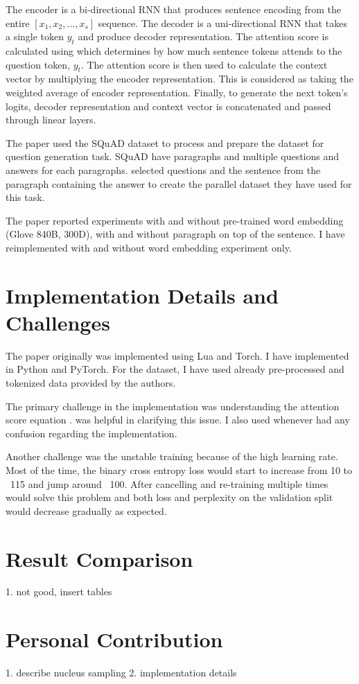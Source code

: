 \documentclass{article}
\begin{document}
	The encoder is a bi-directional RNN that produces sentence encoding from the entire $[x_1, x_2,..., x_s]$ sequence. The decoder is a uni-directional RNN that takes a single token $y_t$ and produce decoder representation. The attention score is calculated using \citet{luong2015effective} which determines by how much sentence tokens attends to the question token, $y_t$. The attention score is then used to calculate the context vector by multiplying the encoder representation. This is considered as taking the weighted average of encoder representation. Finally, to generate the next token's logits, decoder representation and context vector is concatenated and passed through linear layers. 
	
	The paper used the SQuAD dataset to process and prepare the dataset for question generation task. SQuAD have paragraphs and multiple questions and answers for each paragraphs. \cite{du2017learning} selected questions and the sentence from the paragraph containing the answer to create the parallel dataset they have used for this task.
	
	The paper reported experiments with and without pre-trained word embedding (Glove 840B, 300D), with and without paragraph on top of the sentence. I have reimplemented with and without word embedding experiment only.
	
	\section{Implementation Details and Challenges}
	
	The paper originally was implemented using Lua and Torch. I have implemented in Python and PyTorch. For the dataset, I have used already pre-processed and tokenized data provided by the authors. 
	
	The primary challenge in the implementation was understanding the attention score equation \cite[see][eq 5]{du2017learning}. \citet{luong2015effective} was helpful in clarifying this issue. I also used \citet{pytorchFromScratch} whenever had any confusion regarding the implementation. 
	
	Another challenge was the unstable training because of the high learning rate. Most of the time, the binary cross entropy loss would start to increase from 10 to ~115 and jump around ~100. After cancelling and re-training multiple times would solve this problem and both loss and perplexity on the validation split would decrease gradually as expected.
	
	\section{Result Comparison}
	1. not good, insert tables
	\section{Personal Contribution}
	1. describe nucleus sampling
	2. implementation details
	
	
\end{document}
